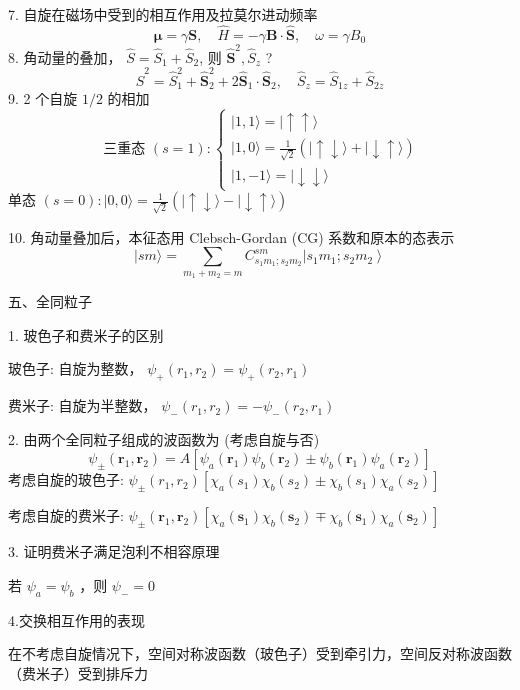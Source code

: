 \documentclass[../../note.tex]{subfiles}
\begin{document}
7. 自旋在磁场中受到的相互作用及拉莫尔进动频率
$$
\boldsymbol{\mu}=\gamma \boldsymbol{S}, \quad \hat{H}=-\gamma \boldsymbol{B} \cdot \hat{\boldsymbol{S}}, \quad \omega=\gamma B_0
$$
8. 角动量的叠加， $\hat{S}=\hat{S}_1+\hat{S}_2$, 则 $\hat{\boldsymbol{S}}^2, \hat{S}_z$ ?
$$
\hat{S}^2=\hat{S}_1^2+\hat{\boldsymbol{S}}_2^2+2 \hat{\boldsymbol{S}}_1 \cdot \hat{\boldsymbol{S}}_2, \quad \hat{S}_z=\hat{S}_{1 z}+\hat{S}_{2 z}
$$
9. 2 个自旋 $1 / 2$ 的相加
$$
\text { 三重态 }(s=1):\left\{\begin{array}{l}
|1,1\rangle=|\uparrow \uparrow\rangle \\
|1,0\rangle=\frac{1}{\sqrt{2}}(|\uparrow \downarrow\rangle+|\downarrow \uparrow\rangle) \\
|1,-1\rangle=|\downarrow \downarrow\rangle
\end{array}\right.
$$
单态 $(s=0):|0,0\rangle=\frac{1}{\sqrt{2}}(|\uparrow \downarrow\rangle-|\downarrow \uparrow\rangle)$

10. 角动量叠加后，本征态用 Clebsch-Gordan (CG) 系数和原本的态表示
$$
|s m\rangle=\sum_{m_1+m_2=m} C_{s_1 m_1 ; s_2 m_2}^{s m}\left|s_1 m_1 ; s_2 m_2\right\rangle
$$

五、全同粒子

1. 玻色子和费米子的区别

玻色子: 自旋为整数， $\psi_{+}\left(r_1, r_2\right)=\psi_{+}\left(r_2, r_1\right)$

费米子: 自旋为半整数， $\psi_{-}\left(r_1, r_2\right)=-\psi_{-}\left(r_2, r_1\right)$

2. 由两个全同粒子组成的波函数为 (考虑自旋与否)
$$
\psi_{ \pm}\left(\boldsymbol{r}_1, \boldsymbol{r}_2\right)=A\left[\psi_a\left(\boldsymbol{r}_1\right) \psi_b\left(\boldsymbol{r}_2\right) \pm \psi_b\left(\boldsymbol{r}_1\right) \psi_a\left(\boldsymbol{r}_2\right)\right]
$$
考虑自旋的玻色子: $\psi_{ \pm}\left(r_1, r_2\right)\left[\chi_a\left(s_1\right) \chi_b\left(s_2\right) \pm \chi_b\left(s_1\right) \chi_a\left(s_2\right)\right]$ 

考虑自旋的费米子: $\psi_{ \pm}\left(\boldsymbol{r}_1, \boldsymbol{r}_2\right)\left[\chi_a\left(\boldsymbol{s}_1\right) \chi_b\left(\boldsymbol{s}_2\right) \mp \chi_b\left(\boldsymbol{s}_1\right) \chi_a\left(\boldsymbol{s}_2\right)\right]$

3. 证明费米子满足泡利不相容原理

若 $\psi_a=\psi_b$ ，则 $\psi_{-}=0$

4.交换相互作用的表现

在不考虑自旋情况下，空间对称波函数（玻色子）受到牵引力，空间反对称波函数（费米子）受到排斥力
\end{document}
